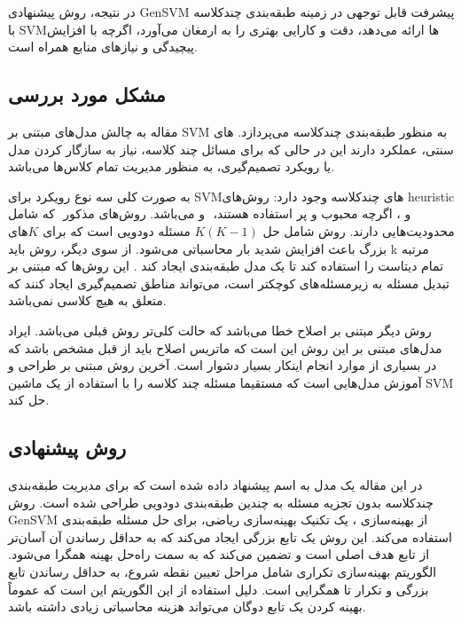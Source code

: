 \documentclass{article}
\begin{document}
در نتیجه، روش پیشنهادی GenSVM پیشرفت قابل توجهی در زمینه طبقه‌بندی چندکلاسه با SVMها ارائه می‌دهد، دقت و کارایی بهتری را به ارمغان می‌آورد، اگرچه با افزایش پیچیدگی و نیازهای منابع همراه است.





\subsection{مشکل مورد بررسی}

مقاله به چالش مدل‌های مبتنی بر SVM به منظور طبقه‌بندی چندکلاسه می‌پردازد.
های سنتی، عملکرد
دارند این در حالی که برای مسائل چند کلاسه، نیاز به سازگار کردن مدل یا رویکرد تصمیم‌گیری، به منظور مدیریت تمام کلاس‌ها می‌باشد. 

به صورت کلی سه نوع رویکرد برای SVMهای چندکلاسه وجود دارد: روش‌های 
heuristic
که شامل 
‎
 و 
  می‌باشد.
روش‌های مذکور 
‎
و
،
اگرچه محبوب و پر استفاده هستند، محدودیت‌هایی دارند. روش
شامل حل
$K(K-1)$ 
مسئله دودویی است که برای
$K$های
بزرگ باعث افزایش شدید بار محاسباتی می‌شود. از سوی دیگر، روش
باید k مرتبه تمام دیتاست را استفاده کند تا یک مدل طبقه‌بندی ایجاد کند . این روش‌ها که مبتنی بر تبدیل مسئله به زیرمسئله‌های کوچکتر است، می‌تواند مناطق تصمیم‌گیری ایجاد کنند که متعلق به هیچ کلاسی نمی‌باشد.

روش دیگر مبتنی بر اصلاح خطا می‌باشد که حالت کلی‌تر روش قبلی می‌باشد. ایراد مدل‌های مبتنی بر این روش این است که ماتریس اصلاح باید از قبل مشخص باشد که در بسیاری از موارد انجام اینکار بسیار دشوار است. آخرین روش مبتنی بر طراحی و آموزش مدل‌هایی است که مستقیما مسئله چند کلاسه را با استفاده از یک ماشین SVM حل کند.

\subsection{روش پیشنهادی}

در این مقاله یک مدل به اسم
پیشنهاد داده شده است که برای مدیریت طبقه‌بندی چندکلاسه بدون تجزیه مسئله به چندین طبقه‌بندی دودویی طراحی شده است. روش GenSVM از بهینه‌سازی
،
یک تکنیک بهینه‌سازی ریاضی، برای حل مسئله طبقه‌بندی استفاده می‌کند. این روش یک تابع بزرگی ایجاد می‌کند که به حداقل رساندن آن آسان‌تر از تابع هدف اصلی است و تضمین می‌کند که به سمت راه‌حل بهینه همگرا می‌شود. الگوریتم بهینه‌سازی تکراری شامل مراحل تعیین نقطه شروع، به حداقل رساندن تابع بزرگی و تکرار تا همگرایی است. دلیل استفاده از این الگوریتم این است که عموماً بهینه کردن یک تابع دوگان می‌تواند هزینه محاسباتی زیادی داشته باشد.
\end{document}
